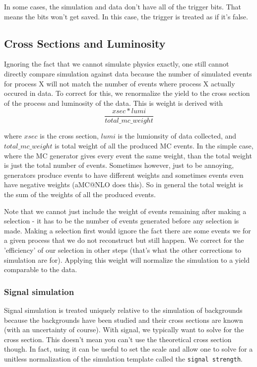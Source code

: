 In some cases, the simulation and data don't have all of the trigger bits. That means the bits won't get saved. In this case, the trigger is treated as if it's false. 

\subsection{Cross Sections and Luminosity}
Ignoring the fact that we cannot simulate physics exactly, one still cannot directly compare simulation against data because the number of simulated events for process X will not match the number of events where process X actually occured in data. To correct for this, we renormalize the yield to the cross section of the process and luminosity of the data. This is weight is derived with
\begin{equation}
    \frac{xsec*lumi}{total\_mc\_weight}
\end{equation}

where $xsec$ is the cross section, $lumi$ is the lumionsity of data collected, and $total\_mc\_weight$ is total weight of all the produced MC events. 
In the simple case, where the MC generator gives every event the same weight, than the total weight is just the total number of events. 
Sometimes however, just to be annoying, generators produce events to have different weights and sometimes events even have negative weights (aMC@NLO does this). 
So in general the total weight is the sum of the weights of all the produced events. 

Note that we cannot just include the weight of events remaining after making a selection - it has to be the number of events generated before any selection is made. 
Making a selection first would ignore the fact there are some events we for a given process that we do not reconstruct but still happen. 
We correct for the 'efficiency' of our selection in other steps (that's what the other corrections to simulation are for).
Applying this weight will normalize the simulation to a yield comparable to the data.

\subsubsection{Signal simulation}
Signal simulation is treated uniquely relative to the simulation of backgrounds because the backgrounds have been studied and their cross sections are known (with an uncertainty of course). With signal, we typically want to solve for the cross section. This doesn't mean you can't use the theoretical cross section though. In fact, using it can be useful to set the scale and allow one to solve for a unitless normalization of the simulation template called the \verb"signal strength".


